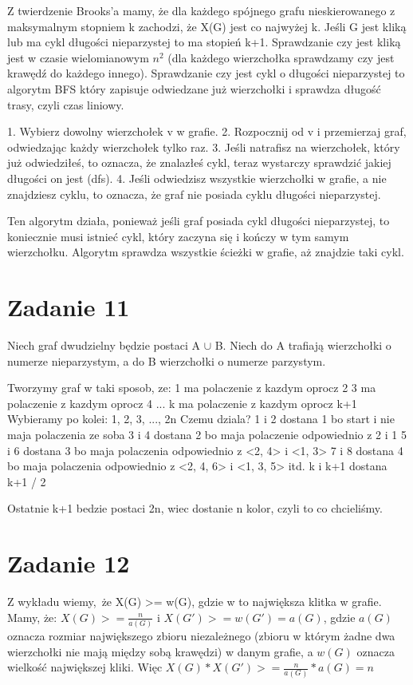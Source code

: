 \documentclass[12pt]{article}
\begin{document}
Z twierdzenie Brooks'a mamy, że dla każdego spójnego grafu nieskierowanego z maksymalnym stopniem k zachodzi, że X(G) jest co najwyżej k. Jeśli G jest kliką lub ma cykl długości nieparzystej to ma stopień k+1.
Sprawdzanie czy jest kliką jest w czasie wielomianowym $n^2$ (dla każdego wierzchołka sprawdzamy czy jest krawędź do każdego innego).
Sprawdzanie czy jest cykl o długości nieparzystej to algorytm BFS który zapisuje odwiedzane już wierzchołki i sprawdza długość trasy, czyli czas liniowy.


1. Wybierz dowolny wierzchołek v w grafie.
2. Rozpocznij od v i przemierzaj graf, odwiedzając każdy wierzchołek tylko raz.
3. Jeśli natrafisz na wierzchołek, który już odwiedziłeś, to oznacza, że znalazłeś cykl, teraz wystarczy sprawdzić jakiej długości on jest (dfs).
4. Jeśli odwiedzisz wszystkie wierzchołki w grafie, a nie znajdziesz cyklu, to oznacza, że graf nie posiada cyklu długości nieparzystej.

Ten algorytm działa, ponieważ jeśli graf posiada cykl długości nieparzystej, to koniecznie musi istnieć cykl, który zaczyna się i kończy w tym samym wierzchołku. Algorytm sprawdza wszystkie ścieżki w grafie, aż znajdzie taki cykl.

\section{Zadanie 11} %
Niech graf dwudzielny będzie postaci A $\cup$ B. 
Niech do A trafiają wierzchołki o numerze nieparzystym, a do B wierzchołki o numerze parzystym.

Tworzymy graf w taki sposob, ze:
1 ma polaczenie z kazdym oprocz 2
3 ma polaczenie z kazdym oprocz 4
...
k ma polaczenie z kazdym oprocz k+1 
Wybieramy po kolei:
1, 2, 3, ..., 2n
Czemu dziala?
1 i 2 dostana 1 bo start i nie maja polaczenia ze soba
3 i 4 dostana 2 bo maja polaczenie odpowiednio z 2 i 1 
5 i 6 dostana 3 bo maja polaczenia odpowiednio z <2, 4> i <1, 3>
7 i 8 dostana 4 bo maja polaczenia odpowiednio z <2, 4, 6> i <1, 3, 5> itd.
k i k+1 dostana k+1 / 2 

Ostatnie k+1 bedzie postaci 2n, wiec dostanie n kolor, czyli to co chcieliśmy.


\section{Zadanie 12} %
Z wykładu wiemy, że X(G) >= w(G), gdzie w to największa klitka w grafie.
Mamy, że:
$X(G) >= \frac{n}{a(G)}$
i $X(G') >= w(G') = a(G)$, gdzie $a(G)$ oznacza rozmiar największego zbioru niezależnego (zbioru w którym żadne dwa wierzchołki nie mają między sobą krawędzi) w danym grafie, a $w(G)$ oznacza wielkość największej kliki. 
Więc $X(G) * X(G') >= \frac{n}{a(G)} * a(G) = n$
\end{document}
